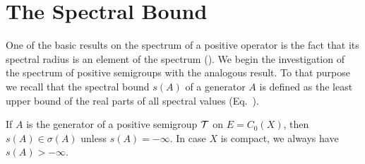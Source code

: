 \section{The Spectral Bound}\label{sec:b3-1}%
One of the basic results on the spectrum of a positive operator is the fact that its spectral radius is an element of the spectrum (\textcite[V.Proposition~4.1]{schaefer:1974}).
We begin the investigation of the spectrum of positive semigroups with the analogous result.
To that purpose we recall that the spectral bound $s(A)$ of a generator $A$ is defined as the least upper bound of the real parts of all spectral values (\cf Eq.~).
%
\begin{theorem}\label{thm:b3-1.1}%
If\/ $A$ is the generator of a positive semigroup $\mathcal{T}$ on $E = C_{0}(X)$, then $s(A) \in \sigma(A)$ unless 
$s(A) = -\infty$.
In case $X$ is compact, we always have $s(A) > -\infty$.
\end{theorem}
\vfill
